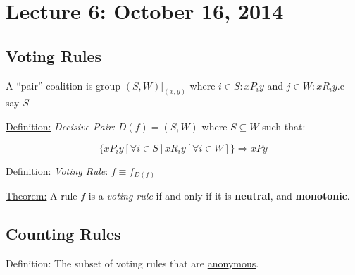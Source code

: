 \documentclass{article}
\begin{document}
\section*{Lecture 6: October 16, 2014}

\subsection*{Voting Rules}

 A  ``pair'' coalition is group $(S,W)|_{(x,y)}$ where $i \in S: xP_iy$ and $j \in W: xR_iy$.e say $S$

\underline{Definition:} \emph{Decisive Pair:}  $D(f) = (S,W)$ where $S\subseteq W$ such that:

\[
\{xP_iy [\forall i \in S] xR_iy [\forall i \in W]\} \Rightarrow xPy
\]

\underline{Definition}: \emph{Voting Rule}: $f \equiv f_{D(f)}$


\underline{Theorem:}
A rule $f$ is a \emph{voting rule} if and only if it is \textbf{neutral}, and \textbf{monotonic}.


\subsection*{Counting Rules}

Definition: The subset of voting rules that are \underline{anonymous}.
\end{document}
